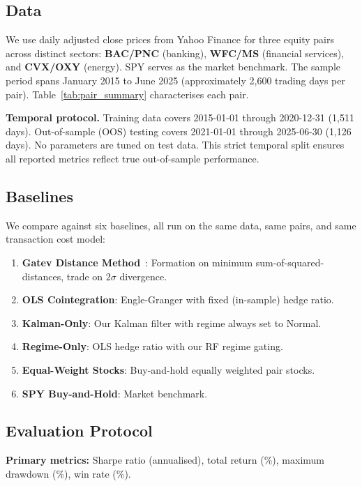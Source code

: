 \documentclass{ieeeaccess}
\begin{document}
\subsection{Data}

We use daily adjusted close prices from Yahoo Finance for three equity pairs across distinct sectors:
\textbf{BAC/PNC} (banking), \textbf{WFC/MS} (financial services), and \textbf{CVX/OXY} (energy).
SPY serves as the market benchmark.
The sample period spans January 2015 to June 2025 (approximately 2{,}600 trading days per pair).
Table~\ref{tab:pair_summary} characterises each pair.



\textbf{Temporal protocol.}
Training data covers 2015-01-01 through 2020-12-31 (1{,}511 days).
Out-of-sample (OOS) testing covers 2021-01-01 through 2025-06-30 (1{,}126 days).
No parameters are tuned on test data.
This strict temporal split ensures all reported metrics reflect true out-of-sample performance.

\subsection{Baselines}

We compare against six baselines, all run on the same data, same pairs, and same transaction cost model:
\begin{enumerate}
    \item \textbf{Gatev Distance Method}~\cite{gatev2006pairs}: Formation on minimum sum-of-squared-distances, trade on $2\sigma$ divergence.
    \item \textbf{OLS Cointegration}: Engle-Granger with fixed (in-sample) hedge ratio.
    \item \textbf{Kalman-Only}: Our Kalman filter with regime always set to Normal.
    \item \textbf{Regime-Only}: OLS hedge ratio with our RF regime gating.
    \item \textbf{Equal-Weight Stocks}: Buy-and-hold equally weighted pair stocks.
    \item \textbf{SPY Buy-and-Hold}: Market benchmark.
\end{enumerate}

\subsection{Evaluation Protocol}

\textbf{Primary metrics:} Sharpe ratio (annualised), total return (\%), maximum drawdown (\%), win rate (\%).
\end{document}
